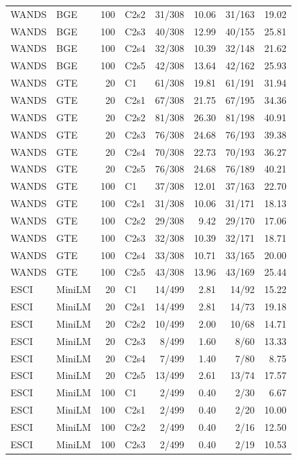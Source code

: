 \begin{longtable}{llrlrrrr}
WANDS & BGE & 100 & C2s2 & 31/308 & 10.06 & 31/163 & 19.02 \\
WANDS & BGE & 100 & C2s3 & 40/308 & 12.99 & 40/155 & 25.81 \\
WANDS & BGE & 100 & C2s4 & 32/308 & 10.39 & 32/148 & 21.62 \\
WANDS & BGE & 100 & C2s5 & 42/308 & 13.64 & 42/162 & 25.93 \\
WANDS & GTE & 20 & C1 & 61/308 & 19.81 & 61/191 & 31.94 \\
WANDS & GTE & 20 & C2s1 & 67/308 & 21.75 & 67/195 & 34.36 \\
WANDS & GTE & 20 & C2s2 & 81/308 & 26.30 & 81/198 & 40.91 \\
WANDS & GTE & 20 & C2s3 & 76/308 & 24.68 & 76/193 & 39.38 \\
WANDS & GTE & 20 & C2s4 & 70/308 & 22.73 & 70/193 & 36.27 \\
WANDS & GTE & 20 & C2s5 & 76/308 & 24.68 & 76/189 & 40.21 \\
WANDS & GTE & 100 & C1 & 37/308 & 12.01 & 37/163 & 22.70 \\
WANDS & GTE & 100 & C2s1 & 31/308 & 10.06 & 31/171 & 18.13 \\
WANDS & GTE & 100 & C2s2 & 29/308 & 9.42 & 29/170 & 17.06 \\
WANDS & GTE & 100 & C2s3 & 32/308 & 10.39 & 32/171 & 18.71 \\
WANDS & GTE & 100 & C2s4 & 33/308 & 10.71 & 33/165 & 20.00 \\
WANDS & GTE & 100 & C2s5 & 43/308 & 13.96 & 43/169 & 25.44 \\
ESCI & MiniLM & 20 & C1 & 14/499 & 2.81 & 14/92 & 15.22 \\
ESCI & MiniLM & 20 & C2s1 & 14/499 & 2.81 & 14/73 & 19.18 \\
ESCI & MiniLM & 20 & C2s2 & 10/499 & 2.00 & 10/68 & 14.71 \\
ESCI & MiniLM & 20 & C2s3 & 8/499 & 1.60 & 8/60 & 13.33 \\
ESCI & MiniLM & 20 & C2s4 & 7/499 & 1.40 & 7/80 & 8.75 \\
ESCI & MiniLM & 20 & C2s5 & 13/499 & 2.61 & 13/74 & 17.57 \\
ESCI & MiniLM & 100 & C1 & 2/499 & 0.40 & 2/30 & 6.67 \\
ESCI & MiniLM & 100 & C2s1 & 2/499 & 0.40 & 2/20 & 10.00 \\
ESCI & MiniLM & 100 & C2s2 & 2/499 & 0.40 & 2/16 & 12.50 \\
ESCI & MiniLM & 100 & C2s3 & 2/499 & 0.40 & 2/19 & 10.53 \\

\end{longtable}
